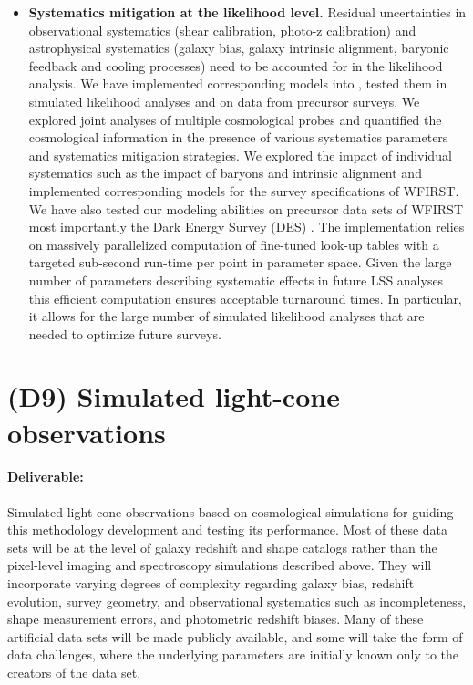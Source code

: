 \begin{itemize}
\item {\bf Systematics mitigation at the likelihood level.} Residual uncertainties in observational systematics (shear calibration, photo-z calibration) and astrophysical systematics (galaxy bias, galaxy intrinsic alignment, baryonic feedback and cooling processes) need to be accounted for in the likelihood analysis. We have implemented corresponding models into \CoLi, tested them in simulated likelihood analyses and on data from precursor surveys. We explored joint analyses of multiple cosmological probes \citep{Krause17,ske17} and quantified the cosmological information in the presence of various systematics parameters and systematics mitigation strategies. We explored the impact of individual systematics such as the impact of baryons and intrinsic alignment \citep{ekd15, keb16,hem18} and implemented corresponding models for the survey specifications of WFIRST. We have also tested our modeling abilities on precursor data sets of WFIRST most importantly the Dark Energy Survey (DES) \citep{kez17, DES17}. The implementation relies on massively parallelized computation of fine-tuned look-up tables with a targeted sub-second run-time per point in parameter space. Given the large number of parameters describing systematic effects in future LSS analyses this efficient computation ensures acceptable turnaround times. In particular, it allows for the large number of simulated likelihood analyses that are needed to optimize future surveys.

\end{itemize}



\section*{(D9) Simulated light-cone observations}

\paragraph*{Deliverable:} Simulated light-cone observations based on
cosmological simulations for guiding this methodology development and testing
its performance. Most of these data sets will be at the level of galaxy redshift
and shape catalogs rather than the pixel-level imaging and spectroscopy
simulations described above.  They will incorporate varying degrees of
complexity regarding galaxy bias, redshift evolution, survey geometry, and
observational systematics such as incompleteness, shape measurement errors, and
photometric redshift biases.  Many of these artificial data sets will be made
publicly available, and some will take the form of data challenges, where the
underlying parameters are initially known only to the creators of the data set.

